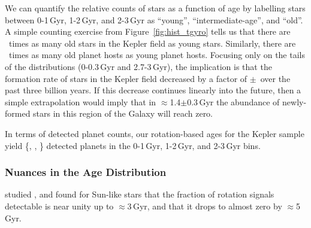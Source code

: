 \documentclass[11pt,twocolumn,tighten]{aastex63}
\begin{document}
We can quantify the relative counts of stars as a function of age by
labelling stars between 0-1\,Gyr, 1-2\,Gyr, and 2-3\,Gyr as ``young'',
``intermediate-age'', and ``old''.  A simple counting exercise from
Figure~\ref{fig:hist_tgyro} tells us that there are
\ratioobtoybstars\ times as many old stars in the Kepler field as young stars.
Similarly, there are \ratioobtoybplanets\ times as many old planet
hosts as young planet hosts.  Focusing only on the tails of the
distributions (0-0.3\,Gyr and 2.7-3\,Gyr), the implication is that the
formation rate of stars in the Kepler field decreased by a factor of
\ratiosfr$\pm$\uncratiosfr\ over the past three billion years.  If
this decrease continues linearly into the future, then a simple
extrapolation would imply that in $\approx$1.4$\pm$0.3\,Gyr the
abundance of newly-formed stars in this region of the Galaxy will
reach zero.

In terms of detected planet counts, our rotation-based ages for the
Kepler sample yield \{\nplyounggyro, \nplmidgyro, \nploldgyro\}
detected planets in the 0-1\,Gyr, 1-2\,Gyr, and 2-3\,Gyr bins.  


\subsubsection{Nuances in the Age Distribution}

 \citet{2022ApJ...937...94M}
studied , and found for Sun-like
stars that the fraction of rotation signals detectable is near unity up to $\approx$3\,Gyr,
and that it drops to almost zero by $\approx$5\,Gyr.  

\end{document}
